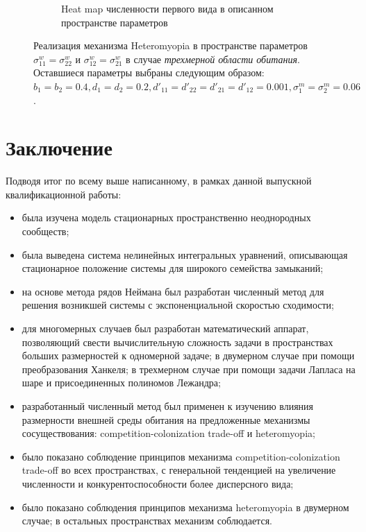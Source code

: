 \begin{figure}[ht]
\begin{subfigure}{.5\textwidth}
	\caption{Heat map численности первого вида в описанном пространстве параметров}
	\label{fig:hmd3:sub4}
\end{subfigure}
	\caption{Реализация механизма Heteromyopia в пространстве параметров  $\sigma_{11}^{w}=\sigma_{22}^{w}$ и $\sigma_{12}^{w}=\sigma_{21}^{w}$ в случае \emph{трехмерной области обитания}. Оставшиеся параметры выбраны следующим образом: $b_{1}=b_{2}=0.4
		, d_{1}=d_{2}=0.2
		, d'_{11}=d'_{22}=d'_{21}=d'_{12}=0.001,
		\sigma_{1}^{m}=\sigma_{2}^{m}=0.06$. }
	\label{fig:hmd3}
\end{figure}


\chapter{Заключение}

Подводя итог по всему выше написанному, в рамках данной выпускной квалификационной работы:
\begin{itemize}
	\item	 была изучена модель стационарных пространственно неоднородных сообществ; 
	\item была выведена система нелинейных интегральных уравнений, описывающая стационарное положение системы для широкого семейства замыканий; 
	\item на основе метода рядов Неймана был разработан численный метод для решения возникшей системы с экспоненциальной скоростью сходимости;
	\item для многомерных случаев был разработан математический аппарат, позволяющий свести вычислительную сложность задачи в пространствах больших размерностей к одномерной задаче; в двумерном случае при помощи преобразования Ханкеля; в трехмерном случае при помощи задачи Лапласа на шаре и присоединенных полиномов Лежандра;
	\item разработанный численный метод был применен к изучению влияния размерности внешней среды обитания на предложенные механизмы сосуществования: competition-colonization trade-off и  heteromyopia;
	\item было показано соблюдение принципов механизма competition-colonization trade-off во всех пространствах, с генеральной тенденцией на увеличение численности и конкурентоспособности более дисперсного вида;
	\item было показано соблюдения принципов механизма heteromyopia  в двумерном случае; в остальных пространствах механизм соблюдается.
		
\end{itemize}

